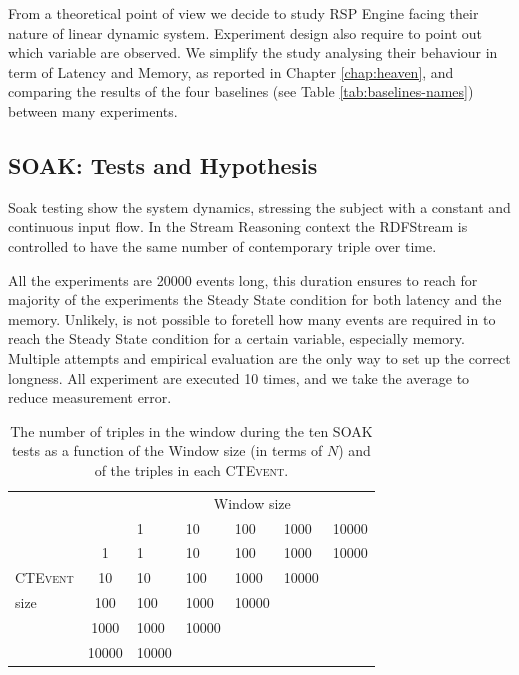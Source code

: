 From a theoretical point of view we decide to study RSP Engine facing their nature of linear dynamic system. Experiment design also require to point out which variable are observed. We simplify the study analysing their behaviour in term of Latency and Memory, as reported in Chapter \ref{chap:heaven}, and comparing the results of the four baselines (see Table \ref{tab:baselines-names}) between many experiments.

\subsection{SOAK: Tests and Hypothesis}\label{sec:soak-es}

Soak testing show the system dynamics, stressing the subject with a constant and continuous input flow. In the Stream Reasoning context the RDFStream is controlled to have the same number of contemporary triple over time. 

All the experiments are 20000 events long, this duration ensures to reach for majority of the experiments the Steady State condition for both latency and the memory. Unlikely, is not possible to foretell how many events are required in to reach the Steady State condition for a certain variable, especially memory. Multiple attempts and empirical evaluation are the only way to set up the correct longness. All experiment are executed 10 times, and we take the average to reduce measurement error. 

\begin{table}[htb]
\centering
 \begin{tabular}{l|c| lllll}
	  	\hline
		\multicolumn{2}{c|}{  } &\multicolumn{5}{c}{Window size}  \\
		\multicolumn{2}{c|}{  } & 1 & 10 & 100 &1000 &10000\\
		\hline
		\hline
		 & 1 & 1 & 10 & 100 & 1000&10000 \\
		\textsc{CTEvent}      & 10  & 10  & 100  & 1000 & 10000  \\
		size             &100   & 100   & 1000 & 10000  \\
					&1000   & 1000 & 10000 \\
					&10000   & 10000  \\
		\hline 
	\end{tabular}
	
	 \vspace{10pt}
	\caption{The number of triples in the window during the ten SOAK tests as a function of the Window size (in terms of $N$) and of the triples in each \textsc{CTEvent}.}
	\label{tab:soaktests}
\end{table}

